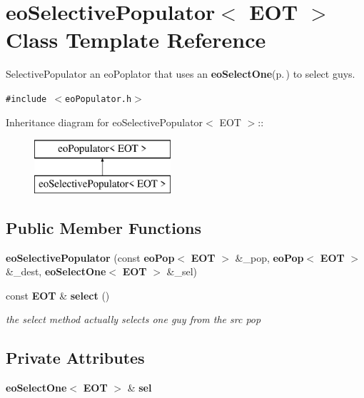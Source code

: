 \section{eo\-Selective\-Populator$<$ EOT $>$ Class Template Reference}
\label{classeo_selective_populator}
Selective\-Populator an eo\-Poplator that uses an {\bf eo\-Select\-One}{\rm (p.\,\pageref{classeo_select_one})} to select guys.  


{\tt \#include $<$eo\-Populator.h$>$}

Inheritance diagram for eo\-Selective\-Populator$<$ EOT $>$::\begin{figure}[H]
\begin{center}
\leavevmode
\includegraphics[height=2cm]{classeo_selective_populator}
\end{center}
\end{figure}
\subsection*{Public Member Functions}
\begin{CompactItemize}
\item 
{\bf eo\-Selective\-Populator} (const {\bf eo\-Pop}$<$ {\bf EOT} $>$ \&\_\-pop, {\bf eo\-Pop}$<$ {\bf EOT} $>$ \&\_\-dest, {\bf eo\-Select\-One}$<$ {\bf EOT} $>$ \&\_\-sel)\label{classeo_selective_populator_a0}

\item 
const {\bf EOT} \& {\bf select} ()\label{classeo_selective_populator_a1}

\begin{CompactList}\small\item\em the select method actually selects one guy from the src pop \item\end{CompactList}\end{CompactItemize}
\subsection*{Private Attributes}
\begin{CompactItemize}
\item 
{\bf eo\-Select\-One}$<$ {\bf EOT} $>$ \& {\bf sel}\label{classeo_selective_populator_r0}

\end{CompactItemize}


